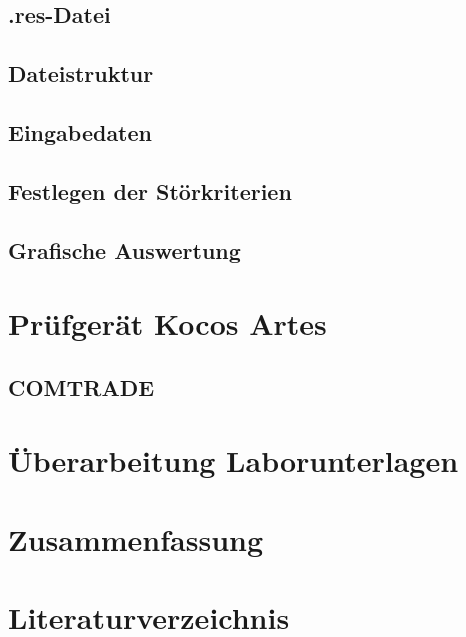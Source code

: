 \documentclass{scrartcl}
\begin{document}
\begin{onehalfspace}
\subsection{.res-Datei}

\subsection{Dateistruktur}
\subsection{Eingabedaten}
\subsection{Festlegen der Störkriterien}
\subsection{Grafische Auswertung}

\section{Prüfgerät Kocos Artes}
\subsection{COMTRADE}

\section{Überarbeitung Laborunterlagen}
\section{Zusammenfassung}

\newpage
{}
\setcounter{page}{1}
\section{Literaturverzeichnis}





\end{onehalfspace}
\end{document}
